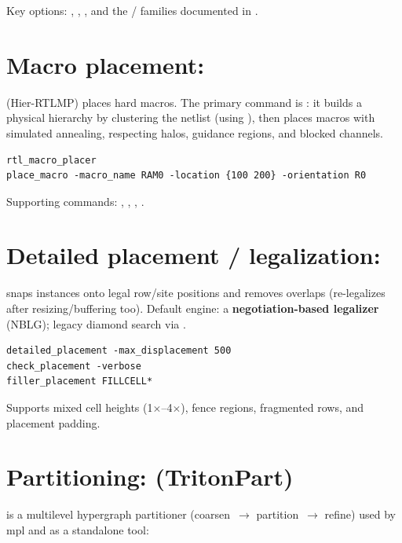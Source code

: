 Key options: , ,
, and the  /
 families documented in .

\section{Macro placement: }

 (Hier-RTLMP) places hard macros. The primary command is
: it builds a physical hierarchy by clustering the
netlist (using ), then places macros with simulated annealing,
respecting halos, guidance regions, and blocked channels.

\begin{lstlisting}[style=ortcl]
rtl_macro_placer
place_macro -macro_name RAM0 -location {100 200} -orientation R0
\end{lstlisting}

Supporting commands: , ,
, .

\section{Detailed placement / legalization: }

 snaps instances onto legal row/site positions and removes
overlaps (re-legalizes after resizing/buffering too). Default engine: a
\textbf{negotiation-based legalizer} (NBLG); legacy diamond search via
.

\begin{lstlisting}[style=ortcl]
detailed_placement -max_displacement 500
check_placement -verbose
filler_placement FILLCELL*
\end{lstlisting}

Supports mixed cell heights (1$\times$--4$\times$), fence regions, fragmented
rows, and placement padding.

\section{Partitioning:  (TritonPart)}

 is a multilevel hypergraph partitioner
(coarsen~$\rightarrow$ partition~$\rightarrow$ refine) used by mpl and as a
standalone tool:

